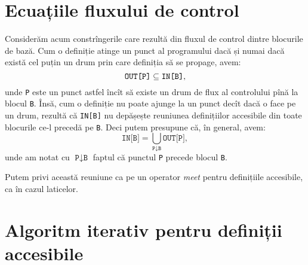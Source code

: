 \section{Ecuațiile fluxului de control}

Considerăm acum constrîngerile care rezultă din fluxul de control dintre
blocurile de bază. Cum o definiție atinge un punct al programului dacă și numai
dacă există cel puțin un drum prin care definiția să se propage, avem:
\[
  \texttt{OUT[P]} \subseteq \texttt{IN[B]},
\]
unde \texttt{P} este un punct astfel încît să existe un drum de flux al
controlului pînă la blocul \texttt{B}. Însă, cum o definiție nu poate ajunge la
un punct decît dacă o face pe un drum, rezultă că \texttt{IN[B]} nu
depășește reuniunea definițiilor accesibile din toate blocurile ce-l
precedă pe \texttt{B}. Deci putem presupune că, în general, avem:
\[
  \texttt{IN[B]} = \bigcup_{\texttt{P} \downarrow \texttt{B}} \texttt{OUT[P]},
\]
unde am notat cu $ \texttt{P} \downarrow \texttt{B} $ faptul că punctul \texttt{P}
precede blocul \texttt{B}.

Putem privi această reuniune ca pe un operator \emph{meet} pentru
definițiile accesibile, ca în cazul laticelor.

\section{Algoritm iterativ pentru definiții accesibile}

